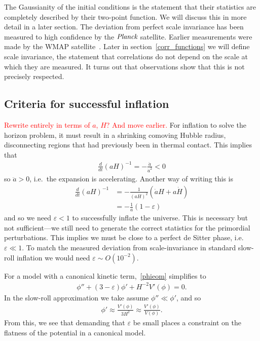     The Gaussianity of the initial conditions is the statement that their statistics are completely described by
    their two-point function. We will discuss this in more detail in a later section.
    The deviation from perfect scale invariance has been measured to high confidence by the $\textit{Planck}$
    satellite.
    Earlier measurements were made by the WMAP satellite~\cite{Senatore_wmap_2009}.
    Later in section~\ref{corr_functions} we will define scale invariance,
    the statement that correlations do not depend on the scale at which they are measured.
    It turns out that observations show that this is not precisely respected.


\subsection{Criteria for successful inflation}
    \textcolor{red}{Rewrite entirely in terms of $a$, $H$? And move earlier.}
    For inflation to solve the horizon problem, it must result in a shrinking comoving
    Hubble radius, disconnecting regions that had previously been in thermal contact.
    This implies that
    \begin{align}
        \frac{d}{dt}\left(aH\right)^{-1} = -\frac{\ddot{a}}{\dot{a}^2} < 0
    \end{align}
    so $\ddot{a}>0$, i.e.\ the expansion is accelerating. Another way of writing this is
    \begin{align}
        \frac{d}{dt}\left(aH\right)^{-1} &= -\frac{1}{(aH)^2}\left(\dot{a}H+a\dot{H}\right)\\
            &= -\frac{1}{a}\left(1-\varepsilon\right)
    \end{align}
    and so we need $\varepsilon<1$ to successfully inflate the universe.
    This is necessary but not sufficient---we still need to generate
    the correct statistics for the primordial perturbations.
    This implies we must be close to a perfect de Sitter phase, i.e.\ $\varepsilon\ll1$.
    To match the measured deviation from scale-invariance in standard slow-roll
    inflation we would need $\varepsilon\sim O(10^{-2})$.


For a model with a canonical kinetic term,~\eqref{phieom} simplifies
to
\begin{align}
    \phi''+(3-\varepsilon)\phi'+H^{-2}V'(\phi)=0.
\end{align}
In the slow-roll approximation we take assume $\phi''\ll\phi'$,
and so
\begin{align}
    \phi'\approx\frac{V'(\phi)}{3H^2}\approx\frac{V'(\phi)}{V(\phi)}.
\end{align}
From this, we see that demanding that $\varepsilon$ be small places a constraint
on the flatness of the potential in a canonical model.


